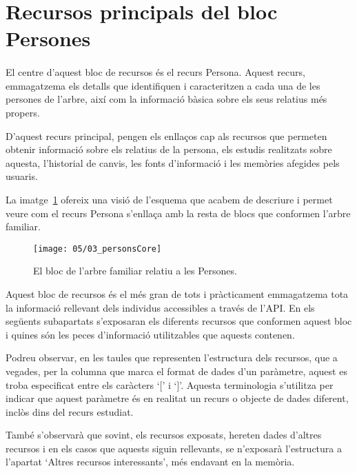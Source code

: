 \section{Recursos principals del bloc Persones}

    \paragraph{}
    El centre d'aquest bloc de recursos és el recurs Persona. Aquest recurs, emmagatzema els detalls que identifiquen i caracteritzen a cada una de les persones de l'arbre, així com la informació bàsica sobre els seus relatius més propers.

    D'aquest recurs principal, pengen els enllaços cap als recursos que permeten obtenir informació sobre els relatius de la persona, els estudis realitzats sobre aquesta, l'historial de canvis, les fonts d'informació i les memòries afegides pels usuaris.

    La imatge~\ref{img:personsBloc} ofereix una visió de l'esquema que acabem de descriure i permet veure com el recurs Persona s'enllaça amb la resta de blocs que conformen l'arbre familiar.

    \begin{figure}[h]
        \texttt{[image: 05/03\_personsCore]}
        \centering
        \caption{El bloc de l'arbre familiar relatiu a les Persones.}\label{img:personsBloc}
    \end{figure}

    Aquest bloc de recursos és el més gran de tots i pràcticament emmagatzema tota la informació rellevant dels individus accessibles a través de l'API. En els següents subapartats s'exposaran els diferents recursos que conformen aquest bloc i quines són les peces d'informació utilitzables que aquests contenen.

    Podreu observar, en les taules que representen l'estructura dels recursos, que a vegades, per la columna que marca el format de dades d'un paràmetre, aquest es troba especificat entre els caràcters `[' i `]'. Aquesta terminologia s'utilitza per indicar que aquest paràmetre és en realitat un recurs o objecte de dades diferent, inclòs dins del recurs estudiat.

    També s'observarà que sovint, els recursos exposats, hereten dades d'altres recursos i en els casos que aquests siguin rellevants, se n'exposarà l'estructura a l'apartat `Altres recursos interessants', més endavant en la memòria.

    
    
    
    
    
    
    
    
    
